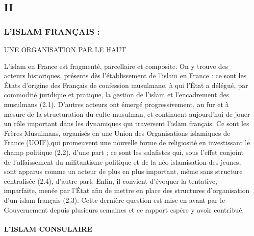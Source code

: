 \hypertarget{ii}{%
\subsection{II}\label{ii}}

\hypertarget{lislam-franuxe7ais}{%
\subsubsection{L'ISLAM FRANÇAIS :}\label{lislam-franuxe7ais}}


UNE ORGANISATION PAR LE HAUT

L'islam en France est fragmenté, parcellaire et composite. On y trouve
des acteurs historiques, présents dès l'établissement de l'islam en
France : ce sont les États d'origine des Français de confession
musulmane, à qui l'État a délégué, par commodité juridique et pratique,
la gestion de l'islam et l'encadrement des musulmans (2.1). D'autres
acteurs ont émergé progressivement, au fur et à mesure de la
structuration du culte musulman, et continuent aujourd'hui de jouer un
rôle important dans les dynamiques qui traversent l'islam français. Ce
sont les Frères Musulmans, organisés en une Union des Organisations
islamiques de France (UOIF),qui promeuvent une nouvelle forme de
religiosité en investissant le champ politique (2.2), d'une part ; ce
sont les salafistes qui, sous l'effet conjoint de l'affaissement du
militantisme politique et de la néo-islamisation des jeunes, sont
apparus comme un acteur de plus en plus important, même sans structure
centralisée (2.4), d'autre part. Enfin, il convient d'évoquer la
tentative, imparfaite, menée par l'État afin de mettre en place des
structures d'organisation d'un islam français (2.3). Cette dernière
question est mise en avant par le Gouvernement depuis plusieurs semaines
et ce rapport espère y avoir contribué.


\hypertarget{lislam-consulaire}{%
\paragraph{L'ISLAM CONSULAIRE}\label{lislam-consulaire}}


